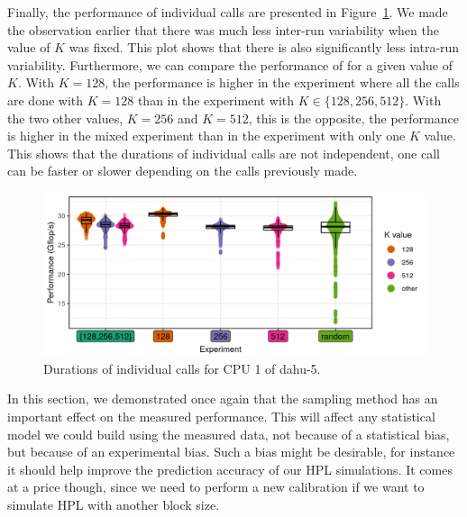             Finally, the performance of individual \dgemm calls are presented in
            Figure~\ref{fig:randomizing_sizes:expfile:fixing_K:raw_data}. We made the observation earlier that there was
            much less inter-run variability when the value of \(K\) was fixed. This plot shows that there is also
            significantly less intra-run variability. Furthermore, we can compare the performance of \dgemm for a given
            value of \(K\). With \(K=128\), the performance is higher in the experiment where all the calls are done
            with \(K=128\) than in the experiment with \(K\in\{128,256,512\}\). With the two other values, \(K=256\) and
            \(K=512\), this is the opposite, the performance is higher in the mixed experiment than in the experiment
            with only one \(K\) value. This shows that the durations of individual \dgemm calls are not independent, one
            call can be faster or slower depending on the calls previously made.
            \begin{figure}[htpb]
                \centering
                \includegraphics[width=1\linewidth]{img/experiment/randomizing_sizes/fixing_K/raw_data.png}
                \caption{Durations of individual \dgemm calls for CPU 1 of dahu-5.}%
                \label{fig:randomizing_sizes:expfile:fixing_K:raw_data}
            \end{figure}

            In this section, we demonstrated once again that the sampling method has an important effect on the measured
            performance. This will affect any statistical model we could build using the measured data, not because of a
            statistical bias, but because of an experimental bias. Such a bias might be desirable, for instance it
            should help improve the prediction accuracy of our HPL simulations. It comes at a price though, since we
            need to perform a new \dgemm calibration if we want to simulate HPL with another block size.

